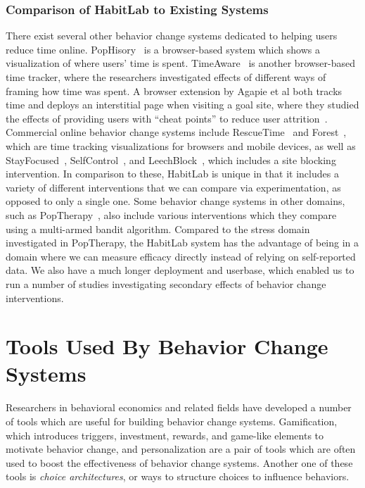 \subsubsection{Comparison of HabitLab to Existing Systems}

There exist several other behavior change systems dedicated to helping users reduce time online. PopHisory~\cite{carrasco2017pophistory} is a browser-based system which shows a visualization of where users' time is spent. TimeAware~\cite{kim2016timeaware} is another browser-based time tracker, where the researchers investigated effects of different ways of framing how time was spent. A browser extension by Agapie et al both tracks time and deploys an interstitial page when visiting a goal site, where they studied the effects of providing users with ``cheat points'' to reduce user attrition~\cite{agapie2016staying}. Commercial online behavior change systems include RescueTime~\cite{rescuetimeapp} and Forest~\cite{forestapp}, which are time tracking visualizations for browsers and mobile devices, as well as StayFocused~\cite{stayfocusd}, SelfControl~\cite{selfcontrolapp}, and LeechBlock~\cite{leechblock}, which includes a site blocking intervention. In comparison to these, HabitLab is unique in that it includes a variety of different interventions that we can compare via experimentation, as opposed to only a single one. Some behavior change systems in other domains, such as PopTherapy~\cite{paredes2014poptherapy}, also include various interventions which they compare using a multi-armed bandit algorithm. Compared to the stress domain investigated in PopTherapy, the HabitLab system has the advantage of being in a domain where we can measure efficacy directly instead of relying on self-reported data. We also have a much longer deployment and userbase, which enabled us to run a number of studies investigating secondary effects of behavior change interventions.

\section{Tools Used By Behavior Change Systems}

Researchers in behavioral economics and related fields have developed a number of tools which are useful for building behavior change systems. Gamification, which introduces triggers, investment, rewards, and game-like elements to motivate behavior change, and personalization are a pair of tools which are often used to boost the effectiveness of behavior change systems. Another one of these tools is \textit{choice architectures}, or ways to structure choices to influence behaviors.

